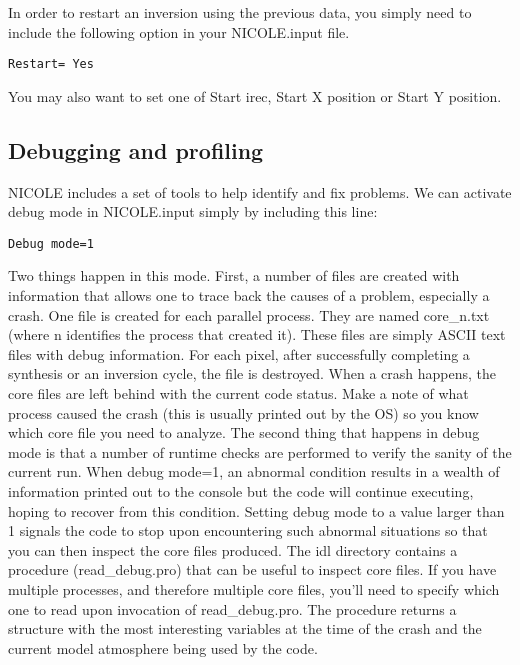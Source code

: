 In order to restart an inversion using the previous data, you simply need 
to include the following option in your NICOLE.input file.

\begin{verbatim}
Restart= Yes
\end{verbatim}

You may also want to set one of Start irec, Start X position or Start Y
position.

\subsection{Debugging and profiling}

NICOLE includes a set of tools to help identify and fix problems. We
can activate debug mode in NICOLE.input simply by including this line:
\begin{verbatim}
Debug mode=1
\end{verbatim}
Two things happen in this mode. First, a number of files are created
with information that allows one to trace back the causes of a problem, 
especially a crash. One file is created for each parallel process. They
are named core\_n.txt (where n identifies the process that created it).
These files are simply ASCII text files with debug information. For
each pixel, after successfully completing a synthesis or an inversion
cycle, the file is destroyed. When a crash happens, the core files are
left behind with the current code status. Make a note of what process
caused the crash (this is usually printed out by the OS) so you know
which core file you need to analyze. The second thing that happens in
debug mode is that a number of runtime checks are performed to verify
the sanity of the current run. When debug mode=1, an abnormal condition
results in a wealth of information printed out to the console but the code
will continue executing, hoping to recover from this condition. Setting 
debug mode to a value larger than 1 signals the code to stop upon 
encountering such abnormal situations
so that you can then inspect the core files produced. The idl directory
contains a procedure (read\_debug.pro) that can be useful to inspect
core files. If you have multiple processes, and therefore multiple
core files, you'll need to specify which one to read upon invocation
of read\_debug.pro. The procedure returns a structure with the most
interesting variables at the time of the crash and the current model
atmosphere being used by the code.

